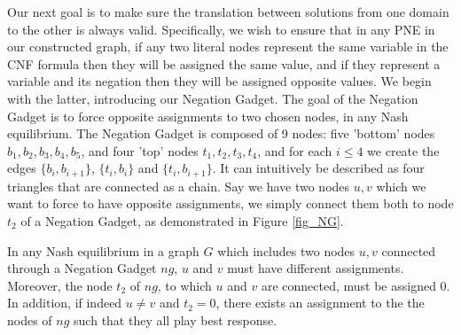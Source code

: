 \documentclass[runningheads]{llncs}
\begin{document}
Our next goal is to make sure the translation between solutions from one domain to the other is always valid. Specifically, we wish to ensure that in any PNE in our constructed graph, if any two literal nodes represent the same variable in the CNF formula then they will be assigned the same value, and if they represent a variable and its negation then they will be assigned opposite values. We begin with the latter, introducing our Negation Gadget. The goal of the Negation Gadget is to force opposite assignments to two chosen nodes, in any Nash equilibrium. The Negation Gadget is composed of 9 nodes: five 'bottom' nodes $b_1,b_2,b_3,b_4,b_5$, and four 'top' nodes $t_1,t_2,t_3,t_4$, and for each $i\leq 4$ we create the edges $\{b_i,b_{i+1}\}$, $\{t_i,b_i\}$ and $\{t_i,b_{i+1}\}$. It can intuitively be described as four triangles that are connected as a chain. Say we have two nodes $u,v$ which we want to force to have opposite assignments, we simply connect them both to node $t_2$ of a Negation Gadget, as demonstrated in Figure \ref{fig_NG}.

\begin{lemma}
\label{lem_neg}
In any Nash equilibrium in a graph $G$ which includes two nodes $u,v$ connected through a Negation Gadget $ng$, $u$ and $v$ must have different assignments. Moreover, the node $t_2$ of $ng$, to which $u$ and $v$ are connected, must be assigned 0. In addition, if indeed $u\neq v$ and $t_2=0$, there exists an assignment to the the nodes of $ng$ such that they all play best response.
\end{lemma}
\end{document}
